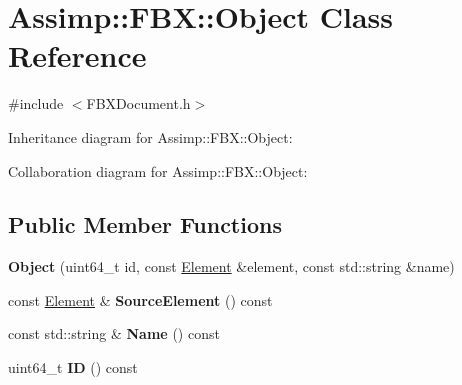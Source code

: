 \hypertarget{class_assimp_1_1_f_b_x_1_1_object}{\section{Assimp\+:\+:F\+B\+X\+:\+:Object Class Reference}
\label{class_assimp_1_1_f_b_x_1_1_object}
}


{\ttfamily \#include $<$F\+B\+X\+Document.\+h$>$}



Inheritance diagram for Assimp\+:\+:F\+B\+X\+:\+:Object\+:


Collaboration diagram for Assimp\+:\+:F\+B\+X\+:\+:Object\+:
\subsection*{Public Member Functions}
\begin{DoxyCompactItemize}
\item 
\hypertarget{class_assimp_1_1_f_b_x_1_1_object_a73436b1d44d10d1ebe2ad0c7bcd4ad60}{{\bfseries Object} (uint64\+\_\+t id, const \hyperlink{class_assimp_1_1_f_b_x_1_1_element}{Element} \&element, const std\+::string \&name)}\label{class_assimp_1_1_f_b_x_1_1_object_a73436b1d44d10d1ebe2ad0c7bcd4ad60}

\item 
\hypertarget{class_assimp_1_1_f_b_x_1_1_object_a664ffee2281f18bb2ed5cab262242717}{const \hyperlink{class_assimp_1_1_f_b_x_1_1_element}{Element} \& {\bfseries Source\+Element} () const }\label{class_assimp_1_1_f_b_x_1_1_object_a664ffee2281f18bb2ed5cab262242717}

\item 
\hypertarget{class_assimp_1_1_f_b_x_1_1_object_a4d14d71c81d30380dc56d6ad649e6800}{const std\+::string \& {\bfseries Name} () const }\label{class_assimp_1_1_f_b_x_1_1_object_a4d14d71c81d30380dc56d6ad649e6800}

\item 
\hypertarget{class_assimp_1_1_f_b_x_1_1_object_a9b92c158e7c539fc6a3624558aa241f2}{uint64\+\_\+t {\bfseries I\+D} () const }\label{class_assimp_1_1_f_b_x_1_1_object_a9b92c158e7c539fc6a3624558aa241f2}

\end{DoxyCompactItemize}
